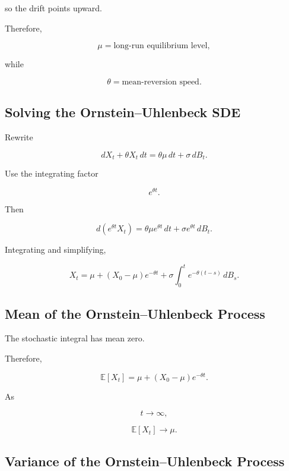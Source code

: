 so the drift points upward.

Therefore,

\[
\boxed{
\mu
=
\text{long-run equilibrium level},
}
\]

while

\[
\boxed{
\theta
=
\text{mean-reversion speed}.
}
\]

\subsection{Solving the Ornstein--Uhlenbeck SDE}
\label{subsec:solve-ou}

Rewrite

\[
dX_t
+
\theta X_t\,dt
=
\theta\mu\,dt
+
\sigma\,dB_t.
\]

Use the integrating factor

\[
e^{\theta t}.
\]

Then

\[
d
\left(
e^{\theta t}X_t
\right)
=
\theta\mu e^{\theta t}\,dt
+
\sigma e^{\theta t}\,dB_t.
\]

Integrating and simplifying,

\[
\boxed{
X_t
=
\mu
+
(X_0-\mu)e^{-\theta t}
+
\sigma
\int_0^t
e^{-\theta(t-s)}
\,dB_s.
}
\]

\subsection{Mean of the Ornstein--Uhlenbeck Process}
\label{subsec:ou-mean}

The stochastic integral has mean zero.

Therefore,

\[
\boxed{
\mathbb{E}[X_t]
=
\mu
+
(X_0-\mu)e^{-\theta t}.
}
\]

As

\[
t\to\infty,
\]

\[
\boxed{
\mathbb{E}[X_t]
\to
\mu.
}
\]

\subsection{Variance of the Ornstein--Uhlenbeck Process}
\label{subsec:ou-variance}

